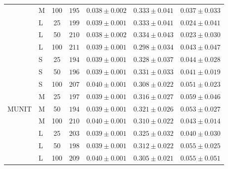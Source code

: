 \begin{table}[h]
{\begin{tabular}{llccccc}
 & M & 100 & $195$ & $0.038 \pm 0.002$ & $0.333 \pm 0.041$ & $0.037 \pm 0.033$ \\
 & L & 25  & $199$ & $0.039 \pm 0.001$ & $0.333 \pm 0.041$ & $0.024 \pm 0.041$ \\
 & L & 50  & $210$ & $0.038 \pm 0.002$ & $0.334 \pm 0.043$ & $0.023 \pm 0.030$ \\
 & L & 100 & $211$ & $0.039 \pm 0.001$ & $0.298 \pm 0.034$ & $0.043 \pm 0.047$ \\
\midrule
\multirow{9}{*}{MUNIT}
 & S & 25  & $194$ & $0.039 \pm 0.001$ & $0.328 \pm 0.037$ & $0.044 \pm 0.028$ \\
 & S & 50  & $196$ & $0.039 \pm 0.001$ & $0.331 \pm 0.033$ & $0.041 \pm 0.019$ \\
 & S & 100 & $207$ & $0.040 \pm 0.001$ & $0.308 \pm 0.022$ & $0.051 \pm 0.023$ \\
 & M & 25  & $197$ & $0.039 \pm 0.001$ & $0.316 \pm 0.027$ & $0.059 \pm 0.046$ \\
 & M & 50  & $194$ & $0.039 \pm 0.001$ & $0.321 \pm 0.026$ & $0.053 \pm 0.027$ \\
 & M & 100 & $210$ & $0.040 \pm 0.001$ & $0.310 \pm 0.022$ & $0.043 \pm 0.014$ \\
 & L & 25  & $203$ & $0.039 \pm 0.001$ & $0.325 \pm 0.032$ & $0.040 \pm 0.030$ \\
 & L & 50  & $198$ & $0.039 \pm 0.001$ & $0.312 \pm 0.022$ & $0.055 \pm 0.025$ \\
 & L & 100 & $209$ & $0.040 \pm 0.001$ & $0.305 \pm 0.021$ & $0.055 \pm 0.051$ \\
\bottomrule
\end{tabular}%
}
\end{table}

